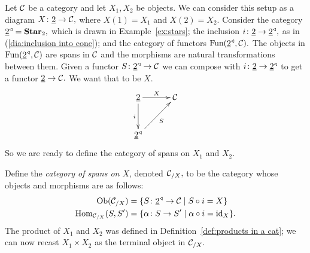 \documentclass[CT4S-EN-RU]{subfiles}
\begin{document}
\begin{constructionENG}[Products]
Let $\mathcal{C}$ be a category and let $X_1,X_2$ be objects. We can consider this setup as a diagram $X\colon\underline{2}\rightarrow\mathcal{C},$ where $X(1)=X_1$ and $X(2)=X_2.$ Consider the category $\underline{2}^\triangleleft={\mathbf{Star}}_2,$ which is drawn in Example~\ref{ex:stars}; the inclusion $i\colon\underline{2}\rightarrow\underline{2}^\triangleleft,$ as in (\ref{dia:inclusion into cone}); and the category of functors $\textnormal{Fun}(\underline{2}^\triangleleft,\mathcal{C}).$ The objects in $\textnormal{Fun}(\underline{2}^\triangleleft,\mathcal{C})$ are spans in $\mathcal{C}$ and the morphisms are natural transformations between them. Given a functor $S\colon\underline{2}^\triangleleft\rightarrow\mathcal{C}$ we can compose with $i\colon\underline{2}\rightarrow\underline{2}^\triangleleft$ to get a functor $\underline{2}\rightarrow\mathcal{C}.$ We want that to be $X.$
$$\xymatrix@=30pt{\ul{2}\ar[r]^{X}\ar[d]_i&\mcC\\\ul{2}\lcone\ar[ur]_S}$$
So we are ready to define the category of spans on $X_1$ and $X_2.$

Define the {\em category of spans on $X$}, denoted $\mathcal{C}_{/X},$ to be the category whose objects and morphisms are as follows:
\begin{align}\label{dia:slice for products}
\textnormal{Ob}(\mathcal{C}_{/X})&=\{S\colon\underline{2}^\triangleleft\rightarrow\mathcal{C}{\;|\;}S\circ i=X\}\\
\nonumber\textnormal{Hom}_{\mathcal{C}_{/X}}(S,S')&=\{\alpha\colon S\rightarrow S'{\;|\;}\alpha\circ i=\textnormal{id}_X\}.
\end{align}
The product of $X_1$ and $X_2$ was defined in Definition~\ref{def:products in a cat}; we can now recast $X_1\times X_2$ as the terminal object in $\mathcal{C}_{/X}.$


\end{constructionENG}
\end{document}
